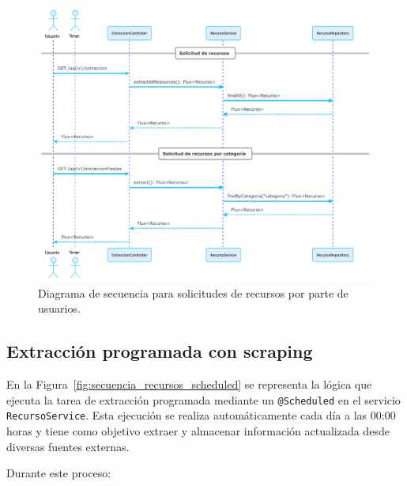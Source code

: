 \begin{figure}[h!tb]
    \centering
    \includegraphics[width=1\textwidth]{figs/secuencia_recursos_usuarios.pdf}
    \caption{Diagrama de secuencia para solicitudes de recursos por parte de usuarios.\label{fig:secuencia_recursos_usuarios}}
\end{figure}

\subsection{Extracción programada con scraping}

En la Figura~\ref{fig:secuencia_recursos_scheduled} se representa la lógica que ejecuta la tarea de extracción programada mediante un \texttt{@Scheduled} en el servicio \texttt{RecursoService}. Esta ejecución se realiza automáticamente cada día a las 00:00 horas y tiene como objetivo extraer y almacenar información actualizada desde diversas fuentes externas.

Durante este proceso:

